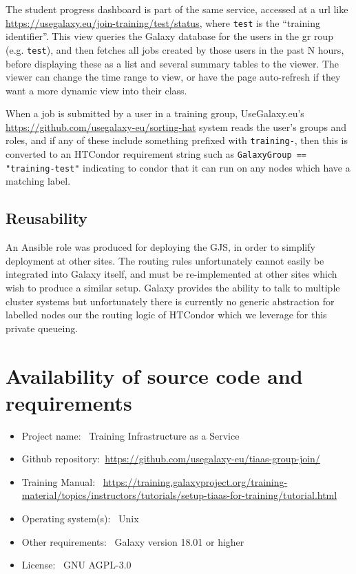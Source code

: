 \documentclass[a4paper,num-refs]{oup-contemporary}
\begin{document}
The student progress dashboard is part of the same service, accessed at a url like \url{https://usegalaxy.eu/join-training/test/status}, where \texttt{test} is the ``training identifier''. This view queries the Galaxy database for the users in the gr roup (e.g. \texttt{test}), and then fetches all jobs created by those users in the past N hours, before displaying these as a list and several summary tables to the viewer. The viewer can change the time range to view, or have the page auto-refresh if they want a more dynamic view into their class.

When a job is submitted by a user in a training group, UseGalaxy.eu's \href{Sorting Hat}{https://github.com/usegalaxy-eu/sorting-hat} system reads the user's groups and roles, and if any of these include something prefixed with \texttt{training-}, then this is converted to an HTCondor requirement string such as \texttt{GalaxyGroup == "training-test"} indicating to condor that it can run on any nodes which have a matching label.

\subsection{Reusability}
An Ansible role was produced for deploying the GJS, in order to simplify deployment at other sites. The routing rules unfortunately cannot easily be integrated into Galaxy itself, and must be re-implemented at other sites which wish to produce a similar setup. Galaxy provides the ability to talk to multiple cluster systems but unfortunately there is currently no generic abstraction for labelled nodes our the routing logic of HTCondor which we leverage for this private queueing.

\section{Availability of source code and requirements}

\begin{itemize}
\item Project name: ~Training Infrastructure as a Service
\item Github repository:~\url{https://github.com/usegalaxy-eu/tiaas-group-join/}
\item Training Manual: ~\url{https://training.galaxyproject.org/training-material/topics/instructors/tutorials/setup-tiaas-for-training/tutorial.html}
\item Operating system(s): ~Unix
\item Other requirements: ~Galaxy version 18.01 or higher
\item License: ~GNU AGPL-3.0
\end{itemize}
\end{document}
